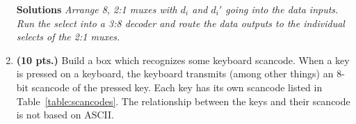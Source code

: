 \begin{enumerate}
            \begin{onlysolution} \textbf{Solutions} \itshape{
                    Arrange 8, 2:1 muxes with $d_i$ and $d_i'$ going into the data inputs.
                    Run the select into a 3:8 decoder and route the data outputs to the
                    individual selects of the 2:1 muxes.
                }
            \end{onlysolution}

        \item \textbf{(10 pts.)}
            \label{page:IsScan}
            Build a box which recognizes some keyboard scancode.  When a key is
            pressed on a keyboard, the keyboard transmits (among other things)
            an 8-bit scancode of the pressed key.  Each key has its own scancode
            listed in Table~\ref{table:scancodes}.  The relationship between the
            keys and their scancode is not based on ASCII.


\end{enumerate}
